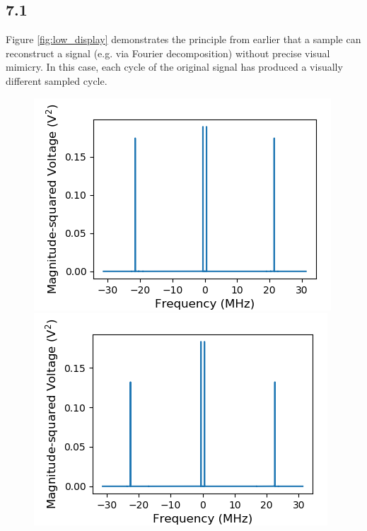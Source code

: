 \documentclass[a4paper]{article}
\begin{document}
\subsection{7.1}

Figure \ref{fig:low_display} demonstrates the principle from earlier that a sample can reconstruct a signal (e.g. via Fourier decomposition) without precise visual mimicry. In this case, each cycle of the original signal has produced a visually different sampled cycle. 

\begin{figure}
\centering
\begin{minipage}{.5\textwidth}
	\centering
	\includegraphics[width=.8\linewidth]{7-1/l_power}
	\caption{}
	\label{fig:low_pow}
\end{minipage}%
\begin{minipage}{.5\textwidth}
	\centering
	\includegraphics[width=.8\linewidth]{7-1/h_power}
	\caption{}
	\label{fig:high_pow}
\end{minipage}
\end{figure}
\end{document}
